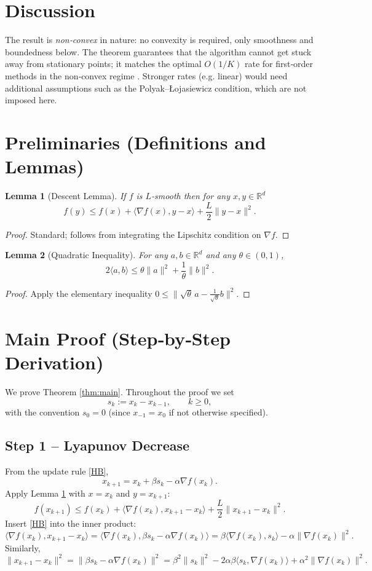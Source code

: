 \documentclass{article}
\newtheorem{lemma}{Lemma}
\begin{document}
\section*{Discussion}
The result is \emph{non‑convex} in nature: no convexity is required, only smoothness and boundedness below. The theorem guarantees that the algorithm cannot get stuck away from stationary points; it matches the optimal $O(1/K)$ rate for first‑order methods in the non‑convex regime \cite{ghadimi2016}. Stronger rates (e.g. linear) would need additional assumptions such as the Polyak–Łojasiewicz condition, which are not imposed here.

\newpage
\section*{Preliminaries (Definitions and Lemmas)}
\begin{lemma}[Descent Lemma]\label{lem:descent}
If $f$ is $L$‑smooth then for any $x,y\in\mathbb{R}^{d}$
\[
f(y)\le f(x)+\langle\nabla f(x),y-x\rangle+\frac{L}{2}\|y-x\|^{2}.
\]
\end{lemma}
\begin{proof}
Standard; follows from integrating the Lipschitz condition on $\nabla f$. \qedhere
\end{proof}

\begin{lemma}[Quadratic Inequality]\label{lem:quad}
For any $a,b\in\mathbb{R}^{d}$ and any $\theta\in(0,1)$,
\[
2\langle a,b\rangle\le\theta\|a\|^{2}+\frac{1}{\theta}\|b\|^{2}.
\]
\end{lemma}
\begin{proof}
Apply the elementary inequality $0\le\| \sqrt{\theta}\,a-\frac{1}{\sqrt{\theta}}b\|^{2}$. \qedhere
\end{proof}

\section*{Main Proof (Step‑by‑Step Derivation)}
We prove Theorem \ref{thm:main}. Throughout the proof we set
\[
s_{k}:=x_{k}-x_{k-1},\qquad k\ge0,
\]
with the convention $s_{0}=0$ (since $x_{-1}=x_{0}$ if not otherwise specified).

\subsection*{Step 1 – Lyapunov Decrease}
From the update rule \eqref{HB},
\[
x_{k+1}=x_{k}+\beta s_{k}-\alpha\nabla f(x_{k}). \tag{2}
\]
Apply Lemma \ref{lem:descent} with $x=x_{k}$ and $y=x_{k+1}$:
\[
f(x_{k+1})\le f(x_{k})+\langle\nabla f(x_{k}),x_{k+1}-x_{k}\rangle+\frac{L}{2}\|x_{k+1}-x_{k}\|^{2}. \tag{3}
\]
Insert \eqref{HB} into the inner product:
\[
\langle\nabla f(x_{k}),x_{k+1}-x_{k}\rangle
= \langle\nabla f(x_{k}),\beta s_{k}-\alpha\nabla f(x_{k})\rangle
= \beta\langle\nabla f(x_{k}),s_{k}\rangle-\alpha\|\nabla f(x_{k})\|^{2}. \tag{4}
\]
Similarly,
\[
\|x_{k+1}-x_{k}\|^{2}
= \|\beta s_{k}-\alpha\nabla f(x_{k})\|^{2}
= \beta^{2}\|s_{k}\|^{2}-2\alpha\beta\langle s_{k},\nabla f(x_{k})\rangle+\alpha^{2}\|\nabla f(x_{k})\|^{2}. \tag{5}
\]
\end{document}
